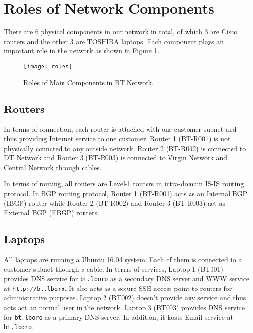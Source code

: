 \section{Roles of Network Components}
\label{sec:components}

There are $6$ physical components in our network in total, of which $3$ are Cisco routers and the other $3$ are TOSHIBA laptops. Each component plays an important role in the network as shown in Figure \ref{fig:roles}.

\begin{figure}[t!]
    \centering
    \texttt{[image: roles]}
    \caption{Roles of Main Components in BT Network.}
    \label{fig:roles}
\end{figure}

\subsection{Routers}
In terms of connection, each router is attached with one customer subnet and thus providing Internet service to one customer. Router 1 (BT-R001) is not physically conncted to any outside network. Router 2 (BT-R002) is connected to DT Network and Router 3 (BT-R003) is connected to Virgin Network and Central Network through cables.

In terms of routing, all routers are Level-1 routers in intra-domain IS-IS routing protocol. In BGP routing protocol, Router 1 (BT-R001) acts as an Internal BGP (IBGP) router while Router 2 (BT-R002) and Router 3 (BT-R003) act as External BGP (EBGP) routers. 



\subsection{Laptops}

All laptops are running a Ubuntu 16.04 system. Each of them is connected to a customer subnet thourgh a cable. 
In terms of services, Laptop 1 (BT001) provides DNS service for \texttt{bt.lboro} as a secondary DNS server and WWW service at \texttt{http://bt.lboro}. It also acts as a secure SSH access point to routers for administrative purposes. 
Laptop 2 (BT002) doesn't provide any service and thus acts act an normal user in the network. 
Laptop 3 (BT003) provides DNS service for \texttt{bt.lboro} as a primary DNS server. In addition, it hosts Email service at \texttt{bt.lboro}.

